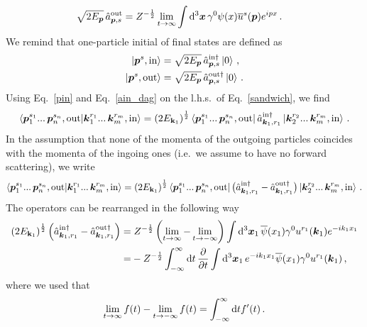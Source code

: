 \begin{sol}
\begin{align}
            \sqrt{2 E_{\boldsymbol{p}}} \, \hat{a}^{\rm out}_{\boldsymbol{p}, s} & = Z^{-\frac{1}{2}} \lim_{t\rightarrow \infty}\int {\rm d}^3 \boldsymbol{x} \, \gamma^0 \psi(x) \overline{u}^s(\boldsymbol{p}) e^{ipx} \,.\label{aout}
    \end{align}
    We remind that one-particle initial of final states are defined as
    \begin{align}
        \ket{\boldsymbol{p}^s, {\rm in}} = &\; \sqrt{2 E_{\boldsymbol{p}}} \, \hat{a}^{{\rm in}\dagger}_{\boldsymbol{p}, s} \ket{0} \,, \label{pin} \\
        \ket{\boldsymbol{p}^s, {\rm out}} = &\; \sqrt{2 E_{\boldsymbol{p}}} \, \hat{a}^{{\rm out}\dagger}_{\boldsymbol{p}, s} \ket{0} \,. \label{pout}
    \end{align}
    Using Eq.~\eqref{pin} and Eq.~\eqref{ain_dag} on the l.h.s.~of Eq.~\eqref{sandwich}, we find
    \begin{align}
        \braket{\boldsymbol{p}_1^{s_1} ...\, \boldsymbol{p}_n^{s_n}, {\rm out}}{\boldsymbol{k}_1^{r_1} ...\, \boldsymbol{k}_m^{r_m}, {\rm in}} 
        = \left( 2 E_{\mathbf{k}_1} \right)^{\frac{1}{2}} \bra{\boldsymbol{p}_1^{s_1} ...\, \boldsymbol{p}_n^{s_n}, {\rm out}} \hat{a}^{{\rm in}\dagger}_{\boldsymbol{k}_1, r_1} \ket{\boldsymbol{k}_2^{r_2} ...\, \boldsymbol{k}_m^{r_m}, {\rm in}} \,.
    \end{align}
    In the assumption that none of the momenta of the outgoing particles coincides with the momenta of the ingoing ones (i.e.\ we assume to have no forward scattering), we write
    \begin{align}
        \braket{\boldsymbol{p}_1^{s_1} ...\, \boldsymbol{p}_n^{s_n}, {\rm out}}{\boldsymbol{k}_1^{r_1} ...\, \boldsymbol{k}_m^{r_m}, {\rm in}} 
        = \left( 2 E_{\mathbf{k}_1} \right)^{\frac{1}{2}} \bra{\boldsymbol{p}_1^{s_1} ...\, \boldsymbol{p}_n^{s_n}, {\rm out}} \big(\hat{a}^{{\rm in}\dagger}_{\boldsymbol{k}_1, r_1}-\hat{a}^{{\rm out}\dagger}_{\boldsymbol{k}_1, r_1} \big) \ket{\boldsymbol{k}_2^{r_2} ...\, \boldsymbol{k}_m^{r_m}, {\rm in}}\,.
    \end{align}
    The operators can be rearranged in the following way
    \begin{align}
        \left( 2 E_{\mathbf{k}_1} \right)^{\frac{1}{2}} \left(\hat{a}^{{\rm in}\dagger}_{\boldsymbol{k}_1, r_1}-\hat{a}^{{\rm out}\dagger}_{\boldsymbol{k}_1, r_1} \right) 
        = &\; Z^{-\frac{1}{2}} \left( \lim_{t \rightarrow \infty} - \lim_{t \rightarrow -\infty}\right) \int {\rm d}^3 \boldsymbol{x}_1 \,\overline{\psi}(x_1) \gamma^0 u^{r_1}(\boldsymbol{k}_1) e^{-ik_1 x_1} \notag \\
        = & - Z^{-\frac{1}{2}} \int_{-\infty}^{\infty} {\rm d} t \, \frac{\partial}{\partial t} \int {\rm d}^3 \boldsymbol{x}_1 \, e^{-i k_1 x_1} \overline{\psi}(x_1) \gamma^0 u^{r_1}(\boldsymbol{k}_1)\,, \label{lebron}
    \end{align}
    where we used that
    \begin{equation}
        \lim_{t \rightarrow \infty} f(t) - \lim_{t \rightarrow -\infty} f(t) = \int_{-\infty}^{\infty} \rmd t f'(t) \,.

\end{equation}
\end{sol}

